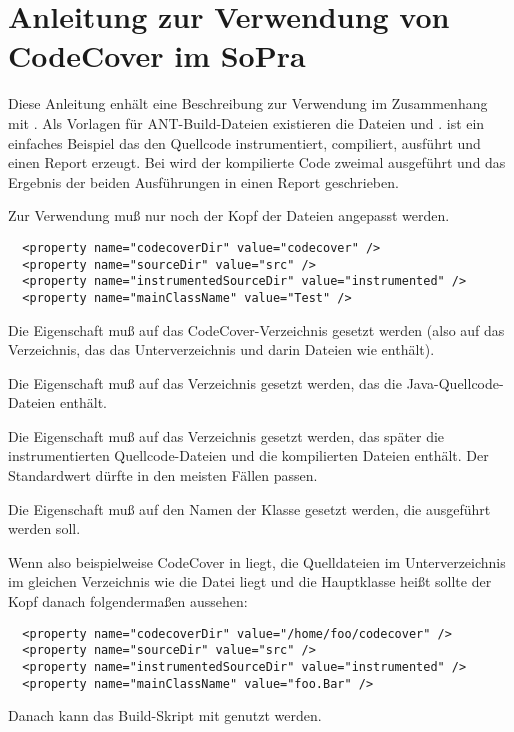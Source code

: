 % 

\section*{Anleitung zur Verwendung von CodeCover im SoPra}


Diese Anleitung enhält eine Beschreibung zur Verwendung im Zusammenhang mit
.
Als Vorlagen für ANT-Build-Dateien existieren die Dateien
 und .
 ist ein einfaches Beispiel das den Quellcode
instrumentiert, compiliert, ausführt und einen Report erzeugt.
Bei  wird der kompilierte Code zweimal ausgeführt
und das Ergebnis der beiden Ausführungen in einen Report geschrieben.

Zur Verwendung muß nur noch der Kopf der Dateien angepasst werden.

\begin{verbatim}
  <property name="codecoverDir" value="codecover" />
  <property name="sourceDir" value="src" />
  <property name="instrumentedSourceDir" value="instrumented" />
  <property name="mainClassName" value="Test" />
\end{verbatim}

Die Eigenschaft  muß auf das CodeCover-Verzeichnis gesetzt
werden (also auf das Verzeichnis, das das Unterverzeichnis  und darin
Dateien wie  enthält).

Die Eigenschaft  muß auf das Verzeichnis gesetzt werden, das
die Java-Quellcode-Dateien enthält.

Die Eigenschaft  muß auf das Verzeichnis gesetzt
werden, das später die instrumentierten Quellcode-Dateien und die kompilierten
Dateien enthält. Der Standardwert  dürfte in den meisten
Fällen passen.

Die Eigenschaft  muß auf den Namen der Klasse gesetzt
werden, die ausgeführt werden soll.


Wenn also beispielweise CodeCover in  liegt,
die Quelldateien im Unterverzeichnis  im gleichen Verzeichnis wie
die Datei  liegt und die Hauptklasse
 heißt sollte der Kopf danach folgendermaßen aussehen:

\begin{verbatim}
  <property name="codecoverDir" value="/home/foo/codecover" />
  <property name="sourceDir" value="src" />
  <property name="instrumentedSourceDir" value="instrumented" />
  <property name="mainClassName" value="foo.Bar" />
\end{verbatim}

Danach kann das Build-Skript mit  genutzt
werden.
